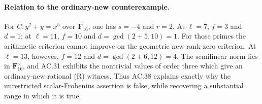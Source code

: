 \paragraph{Relation to the ordinary-new counterexample.}
For \(C:y^2+y=x^5\) over \(\mathbf F_{16}\), one has
\(s=-4\) and \(r=2\). At \(\ell=7\), \(f=3\) and
\(d=1\); at \(\ell=11\), \(f=10\) and
\(d=\gcd(2+5,10)=1\). For those primes the arithmetic
criterion cannot improve on the geometric new-rank-zero
criterion. At \(\ell=13\), however, \(f=12\) and
\(d=\gcd(2+6,12)=4\). The semilinear norm lies in
\(\mathbf F_{16}^\times\), and AC.31 exhibits the
nontrivial values of order three which give an ordinary-new
rational (R) witness. Thus AC.38 explains exactly why
the unrestricted scalar-Frobenius assertion is false,
while recovering a substantial range in which it is true.

